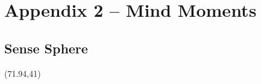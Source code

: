 
\section{Appendix 2 -- Mind Moments}

%
%
\pagestyle{empty}

\makeatletter
{}
\makeatother

\graphicspath{{../}}

\subsection*{Sense Sphere}

\setlength{\tabcolsep}{0pt}
\renewcommand{\arraystretch}{1.1}
\setlength{\TPHorizModule}{1mm}
\setlength{\TPVertModule}{1mm}

\begin{textblock}{1}(71.94,41)

\end{textblock}

